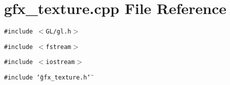 \section{gfx\_\-texture.cpp File Reference}
\label{gfx__texture_8cpp}
{\tt \#include $<$GL/gl.h$>$}\par
{\tt \#include $<$fstream$>$}\par
{\tt \#include $<$iostream$>$}\par
{\tt \#include \char`\"{}gfx\_\-texture.h\char`\"{}}\par
